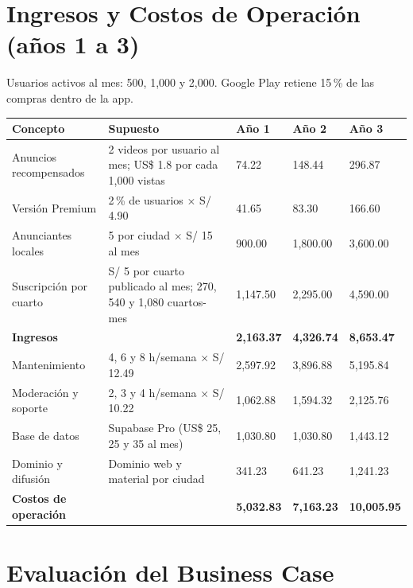 \documentclass[11pt,a4paper]{article}
\begin{document}
\section{Ingresos y Costos de Operación (años 1 a 3)}
Usuarios activos al mes: 500, 1,000 y 2,000. Google Play retiene 15\,\% de las compras dentro de la app.

\vspace{0.1cm}
{\small
\noindent\begin{tabularx}{\textwidth}{@{}P{3.0cm} L Q{1.55cm} Q{1.55cm} Q{1.55cm}@{}}
\toprule
{}
\textbf{Concepto} & \textbf{Supuesto} & \textbf{Año 1} & \textbf{Año 2} & \textbf{Año 3} \\
\midrule
Anuncios recompensados & 2 videos por usuario al mes; US\$ 1.8 por cada 1,000 vistas & 74.22 & 148.44 & 296.87 \\
Versión Premium & 2\,\% de usuarios $\times$ S/ 4.90 & 41.65 & 83.30 & 166.60 \\
Anunciantes locales & 5 por ciudad $\times$ S/ 15 al mes & 900.00 & 1,800.00 & 3,600.00 \\
Suscripción por cuarto & S/ 5 por cuarto publicado al mes; 270, 540 y 1,080 cuartos-mes & 1,147.50 & 2,295.00 & 4,590.00 \\
\textbf{Ingresos} & & \textbf{2,163.37} & \textbf{4,326.74} & \textbf{8,653.47} \\
\midrule
Mantenimiento & 4, 6 y 8 h/semana $\times$ S/ 12.49 & 2,597.92 & 3,896.88 & 5,195.84 \\
Moderación y soporte & 2, 3 y 4 h/semana $\times$ S/ 10.22 & 1,062.88 & 1,594.32 & 2,125.76 \\
Base de datos & Supabase Pro (US\$ 25, 25 y 35 al mes) & 1,030.80 & 1,030.80 & 1,443.12 \\
Dominio y difusión & Dominio web y material por ciudad & 341.23 & 641.23 & 1,241.23 \\
\textbf{Costos de operación} & & \textbf{5,032.83} & \textbf{7,163.23} & \textbf{10,005.95} \\
\bottomrule
\end{tabularx}
}

\section{Evaluación del Business Case}
\end{document}

